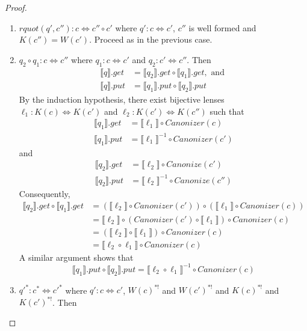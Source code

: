 \documentclass{svproc}
\newcommand{\canonizer}{\ensuremath{\mathit{Canonizer}}}
\begin{document}
\begin{proof}
\begin{enumerate}
  \item
  $\mathit{rquot}(q', c''):c \Leftrightarrow c'' \circ c'$ where $q' : c \Leftrightarrow
  c'$, $c''$ is well formed and $K(c'') = W(c')$. Proceed as in the previous
  case.
\item
$q_2 \circ q_1: c \Leftrightarrow c''$ where $q_1 : c \Leftrightarrow c'$ and
$q_2 : c' \Leftrightarrow c''$. Then
  \begin{align*}
  \llbracket q \rrbracket.get &= \llbracket q_2 \rrbracket.get\circ \llbracket
  q_1 \rrbracket.get, \text{ and }\\
  \llbracket q \rrbracket.put &= \llbracket q_1 \rrbracket.put \circ \llbracket
  q_2 \rrbracket.put
  \end{align*}
  By the induction hypothesis, there exist bijective lenses
  $\ell_1 :
  K(c) \Leftrightarrow K(c')$ and $\ell_2 : K(c') \Leftrightarrow K(c'')$ such
  that
  \begin{align*}
\llbracket q_1 \rrbracket.get &= \llbracket \ell_1 \rrbracket \circ
\canonizer(c)\\
\llbracket q_1 \rrbracket.put &= {\llbracket \ell_1 \rrbracket}^{-1} \circ
\canonizer(c')
\end{align*}
and
\begin{align*}
\llbracket q_2 \rrbracket.get &= \llbracket \ell_2 \rrbracket \circ
Canonize(c')\\
\llbracket q_2 \rrbracket.put &= {\llbracket \ell_2 \rrbracket}^{-1} \circ
Canonize(c'')
\end{align*}
Consequently,
\begin{align*}
\llbracket q_2 \rrbracket.get \circ \llbracket q_1 \rrbracket.get &=
(\llbracket \ell_2 \rrbracket \circ \canonizer(c')) \circ (\llbracket \ell_1
\rrbracket \circ \canonizer(c))\\
&= \llbracket \ell_2 \rrbracket \circ (\canonizer(c') \circ \llbracket \ell_1
\rrbracket) \circ \canonizer(c)\\
&= (\llbracket \ell_2 \rrbracket \circ \llbracket \ell_1 \rrbracket) \circ
\canonizer(c)\\
&= \llbracket \ell_2  \circ  \ell_1 \rrbracket \circ
\canonizer(c)
\end{align*} 
A similar argument shows that 
$$\llbracket q_1 \rrbracket.put \circ \llbracket q_2 \rrbracket.put =
\llbracket \ell_2  \circ  \ell_1 \rrbracket^{-1} \circ
\canonizer(c)$$
\item  
${q'}^* : c^* \Leftrightarrow {c'}^*$ where $q' : c \Leftrightarrow c'$,
$W(c)^{*!}$ and $W(c')^{*!}$ and $K(c)^{*!}$ and $K(c')^{*!}$. Then

\end{enumerate}
\end{proof}
\end{document}
